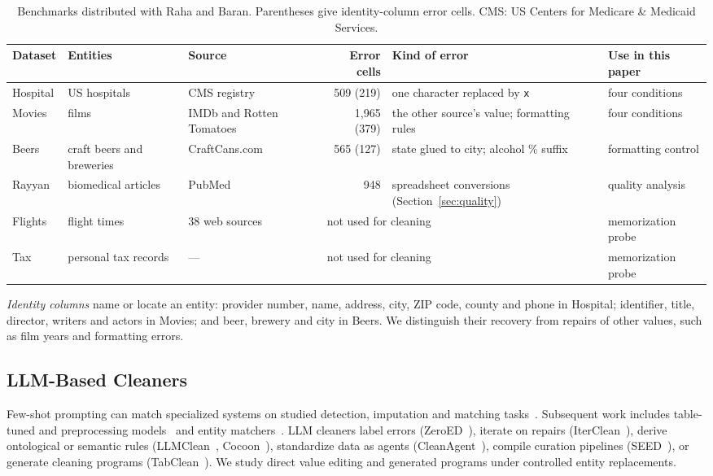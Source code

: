 \documentclass[sigconf, nonacm]{acmart}
\begin{document}
\begin{table}[t]
  \caption{Benchmarks distributed with Raha and Baran. Parentheses give identity-column error
  cells. CMS: US Centers for Medicare \& Medicaid Services.}
  \label{tab:datasets}
  \small
  \setlength{\tabcolsep}{4pt}
  \begin{tabular*}{\textwidth}{@{\extracolsep{\fill}}lllrll@{}}
    \toprule
    Dataset & Entities & Source & Error cells & Kind of error & Use in this paper \\
    \midrule
    Hospital & US hospitals & CMS registry & 509 (219) & one character replaced by \texttt{x} & four conditions \\
    Movies & films & IMDb and Rotten Tomatoes & 1,965 (379) & the other source's value; formatting rules & four conditions \\
    Beers & craft beers and breweries & CraftCans.com & 565 (127) & state glued to city; alcohol \% suffix & formatting control \\
    Rayyan & biomedical articles & PubMed & 948 & spreadsheet conversions (Section~\ref{sec:quality}) & quality analysis \\
    Flights & flight times & 38 web sources & \multicolumn{2}{l}{not used for cleaning} & memorization probe \\
    Tax & personal tax records & --- & \multicolumn{2}{l}{not used for cleaning} & memorization probe \\
    \bottomrule
  \end{tabular*}
\end{table}

\emph{Identity columns} name or locate an entity: provider number, name, address, city, ZIP code,
county and phone in Hospital; identifier, title, director, writers and actors in Movies; and beer,
brewery and city in Beers. We distinguish their recovery from repairs of other values, such as
film years and formatting errors.

\subsection{LLM-Based Cleaners}\label{sec:cleaners}

Few-shot prompting can match specialized systems on studied detection, imputation and matching
tasks~\cite{narayan2022wrangle}. Subsequent work includes table-tuned and preprocessing
models~\cite{li2024tablegpt,zhang2024jellyfish} and entity
matchers~\cite{tu2023unicorn,peeters2025entity}. LLM cleaners label errors
(ZeroED~\cite{ni2025zeroed}), iterate on repairs (IterClean~\cite{ni2024iterclean}), derive
ontological or semantic rules (LLMClean~\cite{10.1007/978-3-031-70421-5_7},
Cocoon~\cite{zhang2025data}), standardize data as agents (CleanAgent~\cite{qi2024cleanagent}),
compile curation pipelines (SEED~\cite{chen2024seeddomainspecificdatacuration}), or generate
cleaning programs (TabClean~\cite{tabclean2026}). We study direct value editing and generated
programs under controlled entity replacements.
\end{document}
